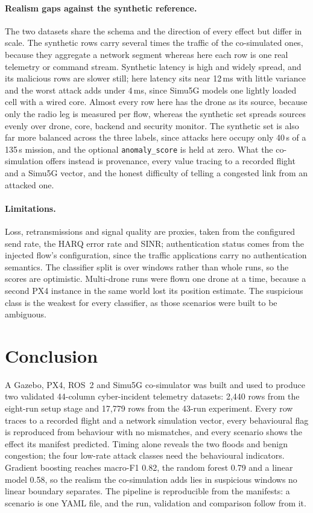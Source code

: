 \documentclass[10pt,twocolumn]{article}
\begin{document}
\paragraph{Realism gaps against the synthetic reference.} The two datasets
share the schema and the direction of every effect but differ in scale. The
synthetic rows carry several times the traffic of the co-simulated ones,
because they aggregate a network segment whereas here each row is one real
telemetry or command stream. Synthetic latency is high and widely spread,
and its malicious rows are slower still; here latency sits near 12\,ms with
little variance and the worst attack adds under 4\,ms, since Simu5G models
one lightly loaded cell with a wired core. Almost every row here has the drone as its source, because only the
radio leg is measured per flow, whereas the synthetic set spreads sources
evenly over drone, core, backend and security monitor. The synthetic set is
also far more balanced across the three labels, since attacks here occupy
only 40\,s of a 135\,s mission, and the optional \texttt{anomaly\_score} is
held at zero. What the co-simulation offers instead is provenance, every
value tracing to a recorded flight and a Simu5G vector, and the honest
difficulty of telling a congested link from an attacked one.

\paragraph{Limitations.} Loss, retransmissions and signal quality are
proxies, taken from the configured send rate, the HARQ error rate and SINR;
authentication status comes from the injected flow's configuration, since
the traffic applications carry no authentication semantics. The classifier
split is over windows rather than whole runs, so the scores are optimistic.
Multi-drone runs were flown one drone at a time, because a second PX4
instance in the same world lost its position estimate. The suspicious class
is the weakest for every classifier, as those scenarios were built to be
ambiguous.

\section{Conclusion}

A Gazebo, PX4, ROS~2 and Simu5G co-simulator was built and used to produce
two validated 44-column cyber-incident telemetry datasets: 2,440 rows from
the eight-run setup stage and 17,779 rows from the 43-run experiment. Every
row traces to a recorded flight and a network
simulation vector, every behavioural flag is reproduced from behaviour with no
mismatches, and every scenario shows the effect its manifest predicted.
Timing alone reveals the two floods and benign congestion; the four low-rate
attack classes need the behavioural indicators. Gradient boosting reaches
macro-F1 0.82, the random forest 0.79 and a linear model 0.58, so the realism
the co-simulation adds lies in suspicious windows no linear boundary
separates. The pipeline is reproducible from the manifests: a scenario is
one YAML file, and the run, validation and comparison follow from it.
\end{document}
